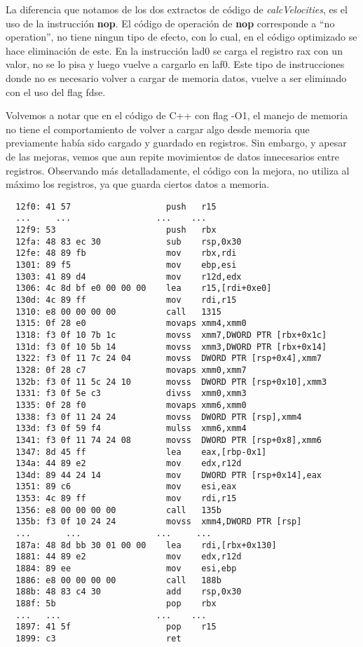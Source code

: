 La diferencia que notamos de los dos extractos de código de \textit{calcVelocities}, es el uso de la instrucción \textbf{nop}. El código de operación de \textbf{nop} corresponde a ``no operation'', no tiene ningun tipo de efecto, con lo cual, en el código optimizado se hace eliminación de este.
En la instrucción lad0 se carga el registro rax con un valor, no se lo pisa y luego vuelve a cargarlo en laf0. Este tipo de instrucciones donde no es necesario volver a cargar de memoria datos, vuelve a ser eliminado con el uso del flag fdse.

Volvemos a notar que en el código de C++ con flag -O1, el manejo de memoria no tiene el comportamiento de volver a cargar algo desde memoria que previamente había sido cargado y guardado en registros. Sin embargo, y apesar de las mejoras, vemos que aun repite movimientos de datos innecesarios entre registros.
Observando más detalladamente, el código con la mejora, no utiliza al máximo los registros, ya que guarda ciertos datos a memoria.


{} 
\begin{lstlisting}
  12f0:	41 57                	push   r15
  ...     ...                 ...    ...
  12f9:	53                   	push   rbx
  12fa:	48 83 ec 30          	sub    rsp,0x30
  12fe:	48 89 fb             	mov    rbx,rdi
  1301:	89 f5                	mov    ebp,esi
  1303:	41 89 d4             	mov    r12d,edx
  1306:	4c 8d bf e0 00 00 00 	lea    r15,[rdi+0xe0]
  130d:	4c 89 ff             	mov    rdi,r15
  1310:	e8 00 00 00 00       	call   1315
  1315:	0f 28 e0             	movaps xmm4,xmm0
  1318:	f3 0f 10 7b 1c       	movss  xmm7,DWORD PTR [rbx+0x1c]
  131d:	f3 0f 10 5b 14       	movss  xmm3,DWORD PTR [rbx+0x14]
  1322:	f3 0f 11 7c 24 04    	movss  DWORD PTR [rsp+0x4],xmm7
  1328:	0f 28 c7             	movaps xmm0,xmm7
  132b:	f3 0f 11 5c 24 10    	movss  DWORD PTR [rsp+0x10],xmm3
  1331:	f3 0f 5e c3          	divss  xmm0,xmm3
  1335:	0f 28 f0             	movaps xmm6,xmm0
  1338:	f3 0f 11 24 24       	movss  DWORD PTR [rsp],xmm4
  133d:	f3 0f 59 f4          	mulss  xmm6,xmm4
  1341:	f3 0f 11 74 24 08    	movss  DWORD PTR [rsp+0x8],xmm6
  1347:	8d 45 ff             	lea    eax,[rbp-0x1]
  134a:	44 89 e2             	mov    edx,r12d
  134d:	89 44 24 14          	mov    DWORD PTR [rsp+0x14],eax
  1351:	89 c6                	mov    esi,eax
  1353:	4c 89 ff             	mov    rdi,r15
  1356:	e8 00 00 00 00       	call   135b
  135b:	f3 0f 10 24 24       	movss  xmm4,DWORD PTR [rsp]
  ...       ...               ...     ...
  187a:	48 8d bb 30 01 00 00 	lea    rdi,[rbx+0x130]
  1881:	44 89 e2             	mov    edx,r12d
  1884:	89 ee                	mov    esi,ebp
  1886:	e8 00 00 00 00       	call   188b 
  188b:	48 83 c4 30          	add    rsp,0x30
  188f:	5b                   	pop    rbx
  ...   ...                   ...    ...
  1897:	41 5f                	pop    r15
  1899:	c3                   	ret 
\end{lstlisting}


